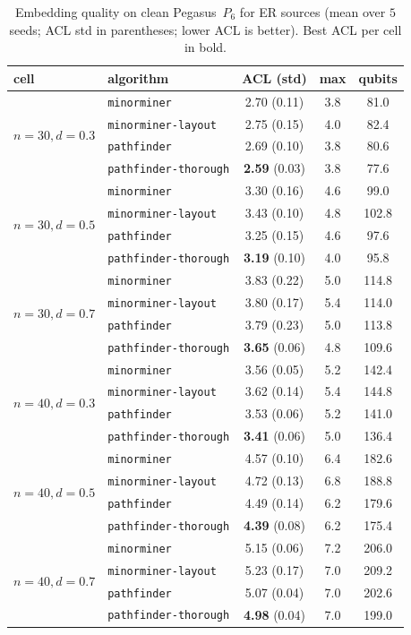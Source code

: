 \documentclass[acmsmall,anonymous,nonacm]{acmart}
\begin{document}
\begin{table}[t]
\caption{Embedding quality on clean Pegasus~$P_6$ for ER sources (mean over $5$
seeds; ACL std in parentheses; lower ACL is better). Best ACL per cell in bold.}
\label{tab:quality}
\small
\begin{tabular}{llccc}
\toprule
cell & algorithm & ACL (std) & max & qubits \\
\midrule
\multirow{4}{*}{$n{=}30,d{=}0.3$}
 & \texttt{minorminer}          & 2.70 (0.11) & 3.8 & 81.0 \\
 & \texttt{minorminer-layout}   & 2.75 (0.15) & 4.0 & 82.4 \\
 & \texttt{pathfinder}          & 2.69 (0.10) & 3.8 & 80.6 \\
 & \texttt{pathfinder-thorough} & \textbf{2.59} (0.03) & 3.8 & 77.6 \\
\midrule
\multirow{4}{*}{$n{=}30,d{=}0.5$}
 & \texttt{minorminer}          & 3.30 (0.16) & 4.6 & 99.0 \\
 & \texttt{minorminer-layout}   & 3.43 (0.10) & 4.8 & 102.8 \\
 & \texttt{pathfinder}          & 3.25 (0.15) & 4.6 & 97.6 \\
 & \texttt{pathfinder-thorough} & \textbf{3.19} (0.10) & 4.0 & 95.8 \\
\midrule
\multirow{4}{*}{$n{=}30,d{=}0.7$}
 & \texttt{minorminer}          & 3.83 (0.22) & 5.0 & 114.8 \\
 & \texttt{minorminer-layout}   & 3.80 (0.17) & 5.4 & 114.0 \\
 & \texttt{pathfinder}          & 3.79 (0.23) & 5.0 & 113.8 \\
 & \texttt{pathfinder-thorough} & \textbf{3.65} (0.06) & 4.8 & 109.6 \\
\midrule
\multirow{4}{*}{$n{=}40,d{=}0.3$}
 & \texttt{minorminer}          & 3.56 (0.05) & 5.2 & 142.4 \\
 & \texttt{minorminer-layout}   & 3.62 (0.14) & 5.4 & 144.8 \\
 & \texttt{pathfinder}          & 3.53 (0.06) & 5.2 & 141.0 \\
 & \texttt{pathfinder-thorough} & \textbf{3.41} (0.06) & 5.0 & 136.4 \\
\midrule
\multirow{4}{*}{$n{=}40,d{=}0.5$}
 & \texttt{minorminer}          & 4.57 (0.10) & 6.4 & 182.6 \\
 & \texttt{minorminer-layout}   & 4.72 (0.13) & 6.8 & 188.8 \\
 & \texttt{pathfinder}          & 4.49 (0.14) & 6.2 & 179.6 \\
 & \texttt{pathfinder-thorough} & \textbf{4.39} (0.08) & 6.2 & 175.4 \\
\midrule
\multirow{4}{*}{$n{=}40,d{=}0.7$}
 & \texttt{minorminer}          & 5.15 (0.06) & 7.2 & 206.0 \\
 & \texttt{minorminer-layout}   & 5.23 (0.17) & 7.0 & 209.2 \\
 & \texttt{pathfinder}          & 5.07 (0.04) & 7.0 & 202.6 \\
 & \texttt{pathfinder-thorough} & \textbf{4.98} (0.04) & 7.0 & 199.0 \\
\bottomrule
\end{tabular}
\end{table}
\end{document}
